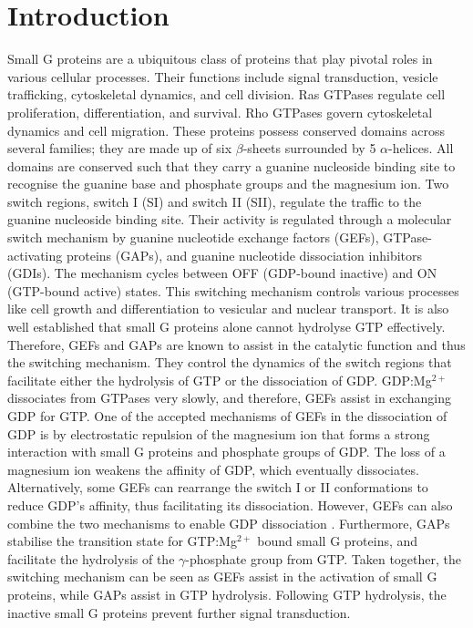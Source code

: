 \documentclass[12pt, a4paper]{achemso}
\begin{document}
\section{Introduction}
Small G proteins are a ubiquitous class of proteins that play pivotal roles in various cellular processes. Their functions include signal transduction, vesicle trafficking, cytoskeletal dynamics, and cell division. Ras GTPases regulate cell proliferation, differentiation, and survival. Rho GTPases govern cytoskeletal dynamics and cell migration.  These proteins possess conserved domains across several families; they are made up of six $\beta$-sheets surrounded by 5 $\alpha$-helices. All domains are conserved such that they carry a guanine nucleoside binding site to recognise the guanine base and phosphate groups and the magnesium ion\cite{toma2019structural, cherfils2013regulation}. Two switch regions, switch I (SI) and switch II (SII), regulate the traffic to the guanine nucleoside binding site. Their activity is regulated through a molecular switch mechanism by guanine nucleotide exchange factors (GEFs), GTPase-activating proteins (GAPs), and guanine nucleotide dissociation inhibitors (GDIs)\cite{cherfils2013regulation}. The mechanism cycles between OFF (GDP-bound inactive) and ON (GTP-bound active) states. This switching mechanism controls various processes like cell growth and differentiation to vesicular and nuclear transport\cite{cherfils2013regulation, loirand2013small}. It is also well established that small G proteins alone cannot hydrolyse GTP effectively. Therefore,  GEFs and GAPs are known to assist in the catalytic function and thus the switching mechanism. They control the dynamics of the switch regions that facilitate either the hydrolysis of GTP or the dissociation of GDP. GDP:Mg$^{2+}$ dissociates from GTPases very slowly, and therefore, GEFs assist in exchanging GDP for GTP. One of the accepted mechanisms of GEFs in the dissociation of GDP is by electrostatic repulsion of the magnesium ion that forms a strong interaction with small G proteins and phosphate groups of GDP. The loss of a magnesium ion weakens the affinity of GDP, which eventually dissociates. Alternatively, some GEFs can rearrange the switch I or II conformations to reduce GDP's affinity, thus facilitating its dissociation. However, GEFs can also combine the two mechanisms to enable GDP dissociation \cite{cherfils1999gefs, cherfils2014gefs}. Furthermore, GAPs stabilise the transition state for GTP:Mg$^{2+}$ bound small G proteins, and facilitate the hydrolysis of the $\gamma$-phosphate group from GTP. Taken together, the switching mechanism can be seen as GEFs assist in the activation of small G proteins, while GAPs assist in GTP hydrolysis. Following GTP hydrolysis, the inactive small G proteins prevent further signal transduction\cite{bos2007gefs}. 
\end{document}
